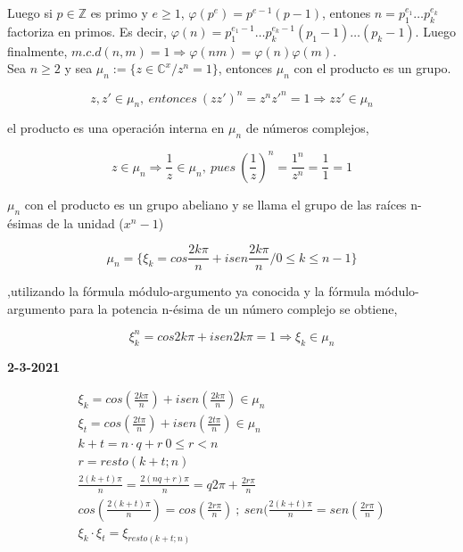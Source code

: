 \documentclass{article}
\begin{document}
Luego si $p\in \mathbb{Z}$ es primo y $e\geq 1$, $\varphi(p^e)=p^{e-1}(p-1)$, entones $n=p_1^{e_1}\ldots p_k^{e_k}$ factoriza en primos. Es decir, $\varphi(n)=p_1^{e_1-1}\ldots p_k^{e_k-1}(p_1-1)\ldots (p_k-1)$. Luego finalmente, $m.c.d(n,m)=1 \Rightarrow \varphi(nm)=\varphi(n)\varphi(m)$. \\

Sea $n \geq 2$ y sea $\mu_n:=\{z\in \mathbb{C}^x/z^n=1\}$, entonces $\mu_n$ con el producto es un grupo.

\begin{equation*}
z,z' \in \mu_n,~entonces~(zz')^n=z^nz'^n=1 \Rightarrow zz' \in \mu_n
\end{equation*}

el producto es una operación interna en $\mu_n$ de números complejos,

\begin{equation*}
z \in \mu_n \Rightarrow \frac{1}{z} \in \mu_n,~pues~ (\frac{1}{z})^n=\frac{1^n}{z^n}=\frac{1}{1}=1
\end{equation*}

$\mu_n$ con el producto es un grupo abeliano y se llama el grupo de las raíces n-ésimas de la unidad ($x^n-1$)

\begin{equation*}
\mu_n=\{\xi_k=cos \frac{2k\pi}{n} + i sen \frac{2k\pi}{n}/0\leq k \leq n-1\}
\end{equation*}

,utilizando la fórmula módulo-argumento ya conocida y la fórmula módulo-argumento para la potencia n-ésima de un número complejo se obtiene,

\begin{equation*}
\xi_k^n=cos 2k\pi + i sen 2k\pi = 1 \Rightarrow \xi_k \in \mu_n
\end{equation*}

\textbf{2-3-2021}

\begin{gather*}
\xi_k=cos(\frac{2k\pi}{n})+i sen(\frac{2k\pi}{n}) \in \mu_n \\
\xi_t=cos(\frac{2t\pi}{n})+i sen(\frac{2t\pi}{n}) \in \mu_n \\
k+t=n\cdot q + r ~ 0\leq r <n \\
r=resto(k+t;n) \\
\frac{2(k+t)\pi}{n}=\frac{2(nq+r)\pi}{n}=q2\pi + \frac{2r\pi}{n} \\
cos(\frac{2(k+t)\pi}{n})=cos(\frac{2r\pi}{n})~;~sen(\frac{2(k+t)\pi}{n}=sen(\frac{2r\pi}{n}) \\
\xi_k\cdot \xi_t=\xi_{resto(k+t;n)}
\end{gather*}
\end{document}
